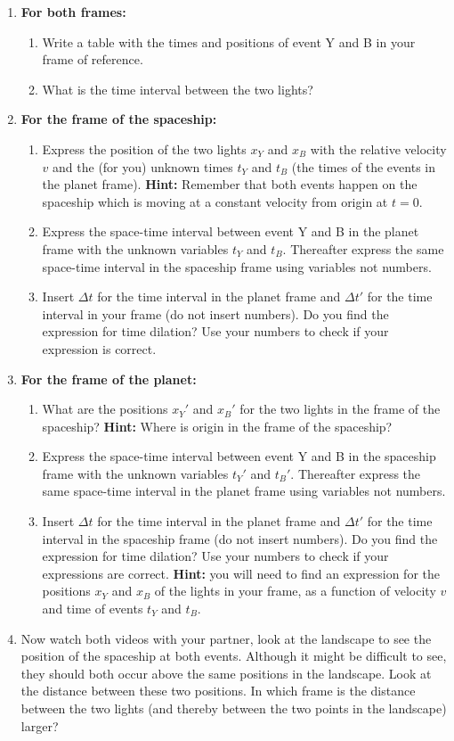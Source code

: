 {\begin{multicols}{2}
\begin{enumerate}
\item {\bf For both frames:} 
\begin{enumerate}
\item Write a table with the times and positions of event Y and B in your frame of reference.
\item What is the time interval between the two lights?
\end{enumerate}
\item {\bf For the frame of the spaceship:}
\begin{enumerate}
\item Express the position of the two lights $x_Y$ and $x_B$ with the relative velocity $v$ and the (for you) unknown times $t_Y$ and $t_B$ (the times of the events in the planet frame). {\bf Hint:} Remember that both events happen on the spaceship which is moving at a constant velocity from origin at $t=0$.
\item Express the space-time interval between event Y and B in the planet frame with the unknown variables $t_Y$ and $t_B$. Thereafter express the same space-time interval in the spaceship frame using variables not numbers.
\item Insert $\Delta t$ for the time interval in the planet frame and $\Delta t'$ for the time interval in your frame (do not insert numbers). Do you find the expression for time dilation? Use your numbers to check if your expression is correct.
\end{enumerate}
\item {\bf For the frame of the planet:}
\begin{enumerate}
\item What are the positions $x_Y'$ and $x_B'$ for the two lights in the frame of the spaceship? {\bf Hint:} Where is origin in the frame of the spaceship?
\item Express the space-time interval between event Y and B in the spaceship frame with the unknown variables $t_Y'$ and $t_B'$. Thereafter express the same space-time interval in the planet frame using variables not numbers.
\item Insert $\Delta t$ for the time interval in the planet frame and $\Delta t'$ for the time interval in the spaceship frame (do not insert numbers). Do you find the expression for time dilation? Use your numbers to check if your expressions are correct. {\bf Hint:} you will need to find an expression for the positions $x_Y$ and $x_B$ of the lights in your frame, as a function of velocity $v$ and time of events $t_Y$ and $t_B$.
\end{enumerate}
\item Now watch both videos with your partner, look at the landscape to see the position of the spaceship at both events. Although it might be difficult to see, they should both occur above the same positions in the landscape. Look at the distance between these two positions. In which frame is the distance between the two lights (and thereby between the two points in the landscape) larger?
\end{enumerate}


\end{multicols}}
